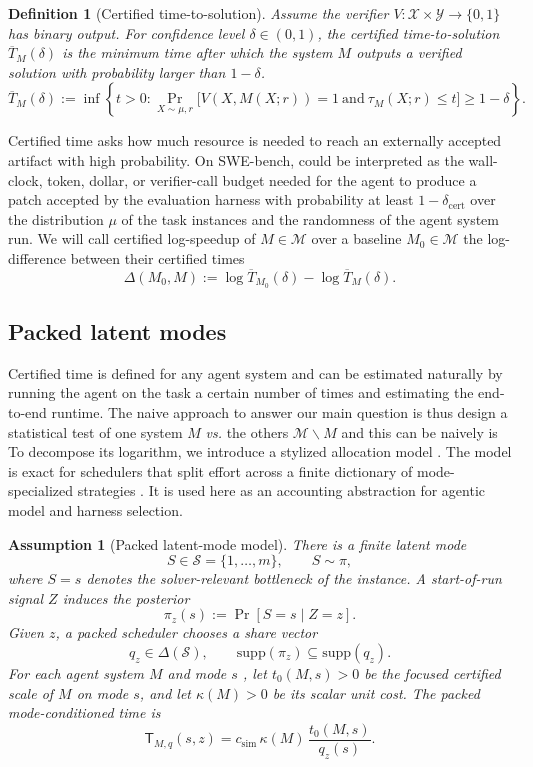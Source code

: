 \documentclass{article}
\newtheorem{assumption}{Assumption}
\newtheorem{definition}{Definition}
\newcommand{\cM}{\mathcal{M}}
\newcommand{\cS}{\mathcal{S}}
\begin{document}
\begin{definition}[Certified time-to-solution]
\label{def:certified-time}
Assume the verifier $V \colon \mathcal{X} \times \mathcal{Y} \to \{0,1\}$ has binary output.
For confidence level \(\delta\in(0,1)\), the certified time-to-solution $\overline T_M(\delta)$ is the minimum time after which the system $M$ outputs a verified solution with probability larger than $1-\delta$.
\[
    \overline T_M(\delta)
    :=
    \inf\left\{
        t>0:
        \Pr_{X\sim\mu,r}
        \big[
            V(X,M(X;r))=1
            \ \mathrm{and}\
            \tau_M(X;r)\le t
        \big]
        \ge 1-\delta
    \right\}.
\]

\end{definition}
Certified time asks how much resource is needed to reach an externally accepted artifact with high probability.
On SWE-bench, could be interpreted as the wall-clock, token, dollar, or verifier-call budget needed for the agent to produce a patch accepted by the evaluation harness with probability at least \(1-\delta_{\mathrm{cert}}\) over the distribution $\mu$ of the task instances and the randomness of the agent system run.
We will call certified log-speedup of \(M \in \cM \) over a baseline \(M_0 \in \cM\) the log-difference between their certified times
\[
    \Delta(M_0,M)
    :=
    \log \overline T_{M_0}(\delta)
    -
    \log \overline T_M(\delta).
\]

\subsection{Packed latent modes}
\label{subsec:packed-latent-modes}

Certified time is defined for any agent system and can be estimated naturally by running the agent on the task a certain number of times and estimating the end-to-end runtime. The naive approach to answer our main question is thus design a statistical test of one system $M$ \textit{vs.} the others $\mathcal{M} \backslash M$ and this can be naively  is  To decompose its logarithm, we
introduce a stylized allocation model .  The model is exact for schedulers that split effort
across a finite dictionary of mode-specialized strategies .  It is used here as an accounting
abstraction for agentic model  and harness selection.

\begin{assumption}[Packed latent-mode model]
\label{ass:packed}
There is a finite latent mode
\[
    S\in\cS=\{1,\ldots,m\},
    \qquad
    S\sim\pi,
\]
where \(S=s\) denotes the solver-relevant bottleneck of the instance.
A start-of-run signal \(Z\) induces the posterior
\[
    \pi_z(s):=\Pr[S=s\mid Z=z].
\]
Given \(z\), a packed scheduler  chooses a share vector
\[
    q_z\in\Delta(\cS),
    \qquad
    \mathrm{supp}(\pi_z)\subseteq \mathrm{supp}(q_z).
\]
For each agent system \(M\)  and mode \(s\) , let \(t_0(M,s)>0\) be the focused
certified scale of \(M\) on mode \(s\), and let \(\kappa(M)>0\) be its scalar unit cost.
The packed mode-conditioned time is
\[
    \mathsf T_{M,q}(s,z)
    =
    c_{\mathrm{sim}}\,
    \kappa(M)\,
    \frac{t_0(M,s)}{q_z(s)} .
\]
\end{assumption}
\end{document}
